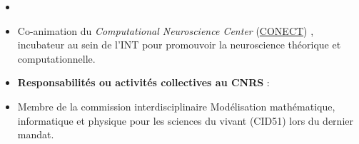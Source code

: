 \documentclass[10pt,french,a4paper,oneside]{article}%
\begin{document}
\begin{itemize}

    \item \ \item Co-animation du \og \textit{Computational Neuroscience Center} (\href{https://conect-int.github.io/}{CONECT}) \fg{}, incubateur au sein de l’INT pour promouvoir la neuroscience théorique et computationnelle.

    \item \textbf{Responsabilités ou activités collectives au CNRS} :
        \item Membre de la commission interdisciplinaire \og Modélisation mathématique, informatique et physique pour les sciences du vivant \fg{} (CID51) lors du dernier mandat.

\end{itemize}


\printbibliography
\end{document}
